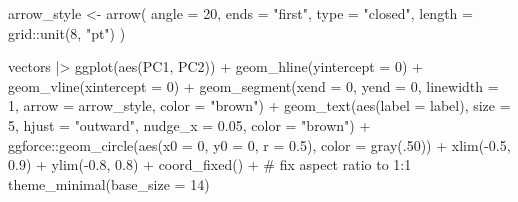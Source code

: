\documentclass[
  letterpaper,
  10pt,
  krantz2]{krantz}
\makeatletter
\newenvironment{Shaded}{\begin{snugshade}}{\end{snugshade}}
\newcommand{\AttributeTok}[1]{\textcolor[rgb]{0.40,0.45,0.13}{#1}}
\newcommand{\CommentTok}[1]{\textcolor[rgb]{0.37,0.37,0.37}{#1}}
\newcommand{\DecValTok}[1]{\textcolor[rgb]{0.68,0.00,0.00}{#1}}
\newcommand{\FloatTok}[1]{\textcolor[rgb]{0.68,0.00,0.00}{#1}}
\newcommand{\FunctionTok}[1]{\textcolor[rgb]{0.28,0.35,0.67}{#1}}
\newcommand{\NormalTok}[1]{\textcolor[rgb]{0.00,0.23,0.31}{#1}}
\newcommand{\OtherTok}[1]{\textcolor[rgb]{0.00,0.23,0.31}{#1}}
\newcommand{\SpecialCharTok}[1]{\textcolor[rgb]{0.37,0.37,0.37}{#1}}
\newcommand{\StringTok}[1]{\textcolor[rgb]{0.13,0.47,0.30}{#1}}
\newenvironment{kframe}{%
  \medskip{}
  \setlength{\fboxsep}{.8em}
  \def\at@end@of@kframe{}%
  \ifinner\ifhmode%
  \def\at@end@of@kframe{\end{minipage}}%
  \begin{minipage}{\columnwidth}%
  \fi\fi%
  \def\FrameCommand##1{\hskip\@totalleftmargin \hskip-\fboxsep
  \colorbox{shadecolor}{##1}\hskip-\fboxsep
      \hskip-\linewidth \hskip-\@totalleftmargin \hskip\columnwidth}%
  \MakeFramed {\advance\hsize-\width
    \@totalleftmargin\z@ \linewidth\hsize
    \@setminipage}}%
{\par\unskip\endMakeFramed%
  \at@end@of@kframe}
\renewenvironment{Shaded}{\begin{kframe}}{\end{kframe}}
\makeatother
\begin{document}
\begin{Shaded}
\begin{Highlighting}[]
\NormalTok{arrow\_style }\OtherTok{\textless{}{-}} \FunctionTok{arrow}\NormalTok{(}
  \AttributeTok{angle =} \DecValTok{20}\NormalTok{, }\AttributeTok{ends =} \StringTok{"first"}\NormalTok{, }\AttributeTok{type =} \StringTok{"closed"}\NormalTok{, }
  \AttributeTok{length =}\NormalTok{ grid}\SpecialCharTok{::}\FunctionTok{unit}\NormalTok{(}\DecValTok{8}\NormalTok{, }\StringTok{"pt"}\NormalTok{)}
\NormalTok{)}

\NormalTok{vectors }\SpecialCharTok{|\textgreater{}}
  \FunctionTok{ggplot}\NormalTok{(}\FunctionTok{aes}\NormalTok{(PC1, PC2)) }\SpecialCharTok{+}
  \FunctionTok{geom\_hline}\NormalTok{(}\AttributeTok{yintercept =} \DecValTok{0}\NormalTok{) }\SpecialCharTok{+}
  \FunctionTok{geom\_vline}\NormalTok{(}\AttributeTok{xintercept =} \DecValTok{0}\NormalTok{) }\SpecialCharTok{+}
  \FunctionTok{geom\_segment}\NormalTok{(}\AttributeTok{xend =} \DecValTok{0}\NormalTok{, }\AttributeTok{yend =} \DecValTok{0}\NormalTok{, }
               \AttributeTok{linewidth =} \DecValTok{1}\NormalTok{, }
               \AttributeTok{arrow =}\NormalTok{ arrow\_style,}
               \AttributeTok{color =} \StringTok{"brown"}\NormalTok{) }\SpecialCharTok{+}
  \FunctionTok{geom\_text}\NormalTok{(}\FunctionTok{aes}\NormalTok{(}\AttributeTok{label =}\NormalTok{ label), }
            \AttributeTok{size =} \DecValTok{5}\NormalTok{,}
            \AttributeTok{hjust =} \StringTok{"outward"}\NormalTok{,}
            \AttributeTok{nudge\_x =} \FloatTok{0.05}\NormalTok{, }
            \AttributeTok{color =} \StringTok{"brown"}\NormalTok{) }\SpecialCharTok{+}
\NormalTok{  ggforce}\SpecialCharTok{::}\FunctionTok{geom\_circle}\NormalTok{(}\FunctionTok{aes}\NormalTok{(}\AttributeTok{x0 =} \DecValTok{0}\NormalTok{, }\AttributeTok{y0 =} \DecValTok{0}\NormalTok{, }\AttributeTok{r =} \FloatTok{0.5}\NormalTok{),  }\AttributeTok{color =} \FunctionTok{gray}\NormalTok{(.}\DecValTok{50}\NormalTok{)) }\SpecialCharTok{+}
  \FunctionTok{xlim}\NormalTok{(}\SpecialCharTok{{-}}\FloatTok{0.5}\NormalTok{, }\FloatTok{0.9}\NormalTok{) }\SpecialCharTok{+} 
  \FunctionTok{ylim}\NormalTok{(}\SpecialCharTok{{-}}\FloatTok{0.8}\NormalTok{, }\FloatTok{0.8}\NormalTok{) }\SpecialCharTok{+}
  \FunctionTok{coord\_fixed}\NormalTok{() }\SpecialCharTok{+}         \CommentTok{\# fix aspect ratio to 1:1}
  \FunctionTok{theme\_minimal}\NormalTok{(}\AttributeTok{base\_size =} \DecValTok{14}\NormalTok{)}
\end{Highlighting}
\end{Shaded}
\end{document}
